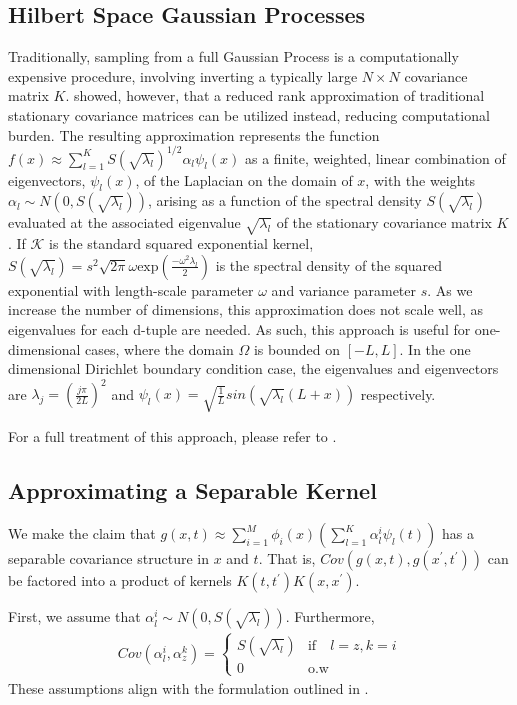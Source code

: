 \subsection{Hilbert Space Gaussian Processes}
\label{appendix:HSGPs}
Traditionally, sampling from a full Gaussian Process is a computationally expensive procedure, involving inverting a typically large $N \times N$ covariance matrix $K$. \cite{Solin_2019} showed, however, that a reduced rank approximation of traditional stationary covariance matrices can be utilized instead, reducing computational burden. The resulting approximation represents the function $f(x)\approx \sum_{l=1}^K S(\sqrt{\lambda_l})^{1/2} \alpha_l \psi_l(x)$ as a finite, weighted, linear combination of eigenvectors, $\psi_l(x)$, of the Laplacian on the domain of $x$, with the weights $\alpha_l \sim N(0,S(\sqrt{\lambda_l}))$, arising as a function of the spectral density $S(\sqrt{\lambda_l})$ evaluated at the associated eigenvalue $\sqrt{\lambda_l}$ of the stationary covariance matrix $K$. If $\mathcal{K}$ is the standard squared exponential kernel, $S(\sqrt{\lambda_l}) = s^2\sqrt{2\pi}\omega \text{exp}(\frac{-\omega^2\lambda_l}{2})$ is the spectral density of the squared exponential with length-scale parameter $\omega$ and variance parameter $s$. As we increase the number of dimensions, this approximation does not scale well, as eigenvalues for each d-tuple are needed. As such, this approach is useful for one-dimensional cases, where the domain $\Omega$ is bounded on  $[-L, L]$. 
In the one dimensional Dirichlet boundary condition case, the eigenvalues and eigenvectors are $\lambda_j = (\frac{j \pi}{2L})^2$ and $\psi_l(x) = \sqrt{\frac{1}{L}}sin(\sqrt{\lambda_l}(L + x))$ respectively. 


For a full treatment of this approach, please refer to \cite{Solin_2019}.  


\subsection{Approximating a Separable Kernel}
\label{appendix:separability_properties}

We make the claim that
$g(x,t) \approx \sum_{i=1}^M \phi_i(x) ( \sum_{l=1}^K \alpha_l^i \psi_l(t))$ has a separable covariance structure in $x$ and $t$. That is, $Cov( g(x,t) , g(x^{'},t^{'} ))$ can be factored into a product of kernels $K(t,t^{'})K(x,x^{'})$. 

First, we assume that $\alpha_l^i \sim N(0, S(\sqrt{\lambda_l}))$. Furthermore,
\begin{align}
\label{eq:cov_separable}
Cov(\alpha_l^i, \alpha_z^k) = 
\begin{cases}
S(\sqrt{\lambda_l})& \text{if} \quad l = z, k = i \\
0 & \text{o.w}
\end{cases}
\end{align}
These assumptions align with the formulation outlined in \cite{Solin_2019}.

